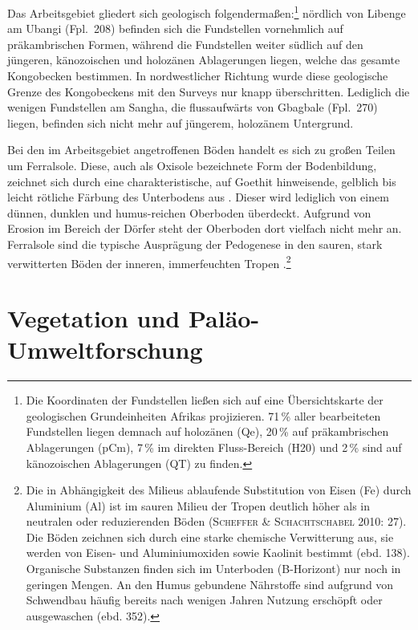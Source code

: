 \begin{multicols}{2}
Das Arbeitsgebiet gliedert sich geologisch folgendermaßen:\footnote{Die Koordinaten der Fundstellen ließen sich auf eine Übersichtskarte der geologischen Grundeinheiten Afrikas \parencite{Persits.2002} projizieren. 71\,\% aller bearbeiteten Fundstellen liegen demnach auf holozänen (Qe), 20\,\% auf präkambrischen Ablagerungen (pCm), 7\,\% im direkten Fluss-Bereich (H20) und 2\,\% sind auf känozoischen Ablagerungen (QT) zu finden.} nördlich von Libenge am \mbox{Ubangi} (Fpl.~208) befinden sich die Fundstellen vornehmlich auf präkambrischen Formen, während die Fundstellen weiter südlich auf den jüngeren, känozoischen und holozänen Ablagerungen liegen, welche das gesamte Kongobecken bestimmen. In nordwestlicher Richtung wurde diese geologische Grenze des Kongobeckens mit den Surveys nur knapp überschritten. Lediglich die wenigen Fundstellen am \mbox{Sangha}, die flussaufwärts von Gbagbale (Fpl.~270) liegen, befinden sich nicht mehr auf jüngerem, holozänem Untergrund. 

Bei den im Arbeitsgebiet angetroffenen Böden handelt es sich zu großen Teilen um Ferralsole. Diese, auch als Oxisole bezeichnete Form der Bodenbildung, zeichnet sich durch eine charakteristische, auf Goethit hinweisende, gelblich bis leicht rötliche Färbung des Unterbodens aus \parencites[351\,f., 355 Abb.~7.6-4]{Scheffer.2010}[144]{Jones.2013}. Dieser wird lediglich von einem dünnen, dunklen und humus-reichen Oberboden überdeckt. Aufgrund von Erosion im Bereich der Dörfer steht der Oberboden dort vielfach nicht mehr an. Ferralsole sind die typische Ausprägung der Pedogenese in den sauren, stark verwitterten Böden der inneren, immerfeuchten Tropen \parencite[27]{Scheffer.2010}.\footnote{Die in Abhängigkeit des Milieus ablaufende Substitution von Eisen (Fe) durch Aluminium (Al) ist im sauren Milieu der Tropen deutlich höher als in neutralen oder reduzierenden Böden (\textsc{Scheffer \& Schachtschabel} 2010: 27). Die Böden zeichnen sich durch eine starke chemische Verwitterung aus, sie werden von Eisen- und Aluminiumoxiden sowie Kaolinit bestimmt (ebd. 138). Organische Substanzen finden sich im Unterboden (B-Horizont) nur noch in geringen Mengen. An den Humus gebundene Nährstoffe sind aufgrund von Schwendbau häufig bereits nach wenigen Jahren Nutzung erschöpft oder ausgewaschen (ebd. 352).}

\section{Vegetation und Paläo-Umweltforschung}\label{sec:Palaeoumwelt}


\end{multicols}
